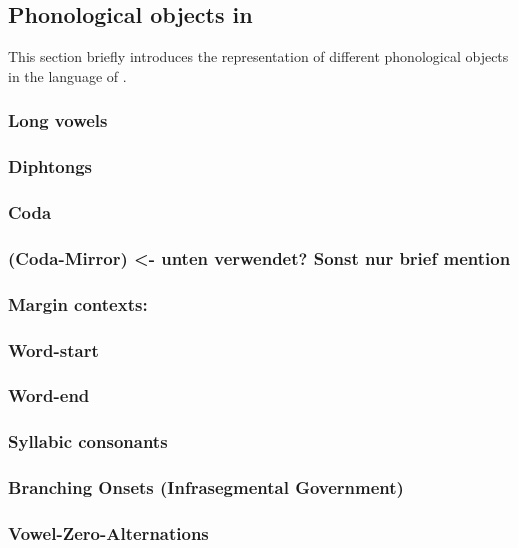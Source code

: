 \subsection{Phonological objects in \CVCV}
\label{subsec:intro:obj}

This section briefly introduces the representation
of different phonological objects in the language of
\CVCV.


\subsubsection{Long vowels}
\subsubsection{Diphtongs}
\subsubsection{Coda}\label{intro:obj:coda}
\subsubsection{(Coda-Mirror) <- unten verwendet? Sonst nur brief mention}
\subsubsection{Margin contexts:}
\subsubsection{Word-start \ctx{\#\_}}\label{intro:obj:word start}
\subsubsection{Word-end \ctx{\_\#}}\label{intro:obj:word end}
\subsubsection{Syllabic consonants}
\subsubsection{Branching Onsets (Infrasegmental Government)}
\subsubsection{Vowel-Zero-Alternations}